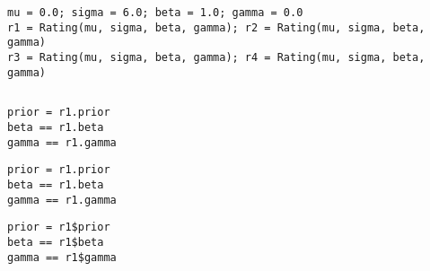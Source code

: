 \documentclass[article]{jss}
\newif\ifen
\newif\ifes
\newcommand{\en}[1]{\ifen#1\fi}
\newcommand{\es}[1]{\ifes#1\fi}
\begin{document}
\en{The class \texttt{Rating()} is represented by: the mean (\texttt{mu}) and the standard deviation (\texttt{sigma}) of the prior Gaussian distribution; the standard deviation of the performance (\texttt{beta}); and the dinamic factor of the skill (\texttt{gamma}).}
\es{La clase \texttt{Rating()} se representa con cuatro atributos: la media (\texttt{mu}) y el desv\'io estandar (\texttt{sigma}) de la distribuci\'on gaussiana a priori; el dev\'io estanndar de los rendimientos (\texttt{beta}); y el factor din\'amico de la habilidad (\texttt{gamma}).}
%
\begin{lstlisting}[backgroundcolor=\color{white},label=lst:rating, caption=\relax, belowskip=-1.0 \baselineskip, aboveskip=-0 \baselineskip]
\end{lstlisting}
\begin{lstlisting}[backgroundcolor=\color{all}]
mu = 0.0; sigma = 6.0; beta = 1.0; gamma = 0.0
r1 = Rating(mu, sigma, beta, gamma); r2 = Rating(mu, sigma, beta, gamma)
r3 = Rating(mu, sigma, beta, gamma); r4 = Rating(mu, sigma, beta, gamma)
\end{lstlisting}  
%
\en{Ratings have 3 attributes.}
\es{Los rating tienen 3 atributos.}
%
\begin{lstlisting}[backgroundcolor=\color{white},label=lst:prior, caption=\relax, belowskip=-1.0 \baselineskip, aboveskip=-0 \baselineskip]
\end{lstlisting}
\begin{paracol}{3}
\begin{lstlisting}[backgroundcolor=\color{julia}]
prior = r1.prior
beta == r1.beta
gamma == r1.gamma
\end{lstlisting}
\switchcolumn
\begin{lstlisting}[backgroundcolor=\color{python}]
prior = r1.prior
beta == r1.beta
gamma == r1.gamma
\end{lstlisting}
\switchcolumn
\begin{lstlisting}[backgroundcolor=\color{r}]
prior = r1$prior
beta == r1$beta
gamma == r1$gamma
\end{lstlisting}
\end{paracol}
%
\en{For efficiency reasons, the prior is stored as \texttt{Gaussian()} class, which has the mean and standard deviation as attributes.}
\es{Por cuesti\'on de eficiencia, el prior se guarda como clase \texttt{Gaussian()}, la que tiene la media y el desv\'io estandar como atributos.}
%
\begin{lstlisting}[backgroundcolor=\color{white},label=lst:prior, caption=\relax, belowskip=-1.0 \baselineskip, aboveskip=-0 \baselineskip]
\end{lstlisting}
\end{document}

